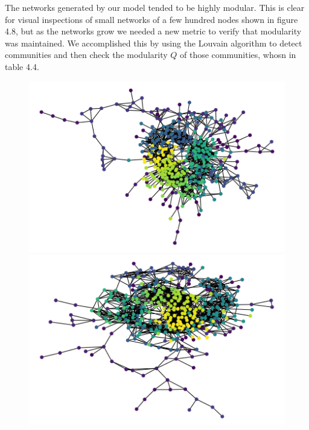 \documentclass[12pt,twoside]{report}
\begin{document}
The networks generated by our model tended to be highly modular. This is clear for visual inspections of small networks of a few hundred nodes shown in figure 4.8, but as the networks grow we needed a new metric to verify that modularity was maintained. We accomplished this by using the Louvain algorithm \cite{blondel2008fast} to detect communities and then check the modularity $Q$ of those communities, whosn in table 4.4. \\

\begin{figure}[H]
\begin{center}
\begin{minipage}{0.45\linewidth}
\includegraphics[width=\linewidth]{figures/1.png}
\end{minipage}%
\hfill
\begin{minipage}{0.45\linewidth}
\includegraphics[width=\linewidth]{figures/3.png}
\end{minipage}
\end{center}
\end{figure}
\end{document}

